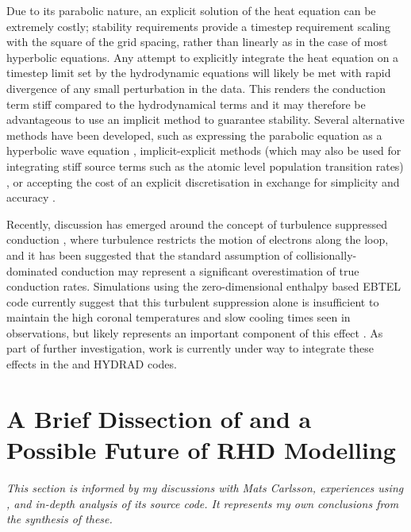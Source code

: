 Due to its parabolic nature, an explicit solution of the heat equation can be extremely costly; stability requirements provide a timestep requirement scaling with the square of the grid spacing, rather than linearly as in the case of most hyperbolic equations.
Any attempt to explicitly integrate the heat equation on a timestep limit set by the hydrodynamic equations will likely be met with rapid divergence of any small perturbation in the data.
This renders the conduction term stiff compared to the hydrodynamical terms and it may therefore be advantageous to use an implicit method  to guarantee stability.
Several alternative methods have been developed, such as expressing the parabolic equation as a hyperbolic wave equation \citep{Rempel2016}, implicit-explicit methods (which may also be used for integrating stiff source terms such as the atomic level population transition rates) \citep[e.g.][]{Ascher1995}, or accepting the cost of an explicit discretisation in exchange for simplicity and accuracy \citep{Bradshaw2003, Bradshaw2013}.

Recently, discussion has emerged around the concept of turbulence suppressed conduction \citep{Bian2016}, where turbulence restricts the motion of electrons along the loop, and it has been suggested that the standard assumption of collisionally-dominated conduction may represent a significant overestimation of true conduction rates.
Simulations using the zero-dimensional enthalpy based EBTEL code currently suggest that this turbulent suppression alone is insufficient to maintain the high coronal temperatures and slow cooling times seen in observations, but likely represents an important component of this effect \citep{Bian2018}.
As part of further investigation, work is currently under way to integrate these effects in the \Radyn{} and HYDRAD codes.

\section{A Brief Dissection of \Radyn{} and a Possible Future of RHD Modelling}\label{Sec:RadynDissection}

\emph{This section is informed by my discussions with Mats Carlsson, experiences using \Radyn{}, and in-depth analysis of its source code. It represents my own conclusions from the synthesis of these.}

